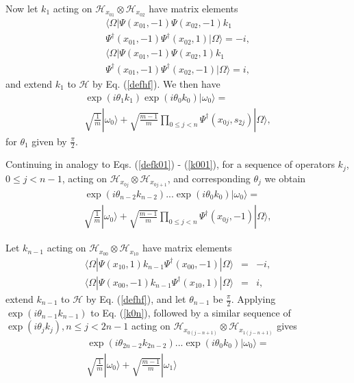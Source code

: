 \documentclass[twocolumn,amsmath,amssymb]{revtex4-1}
\begin{document}
Now let $k_{1}$ acting on $\mathcal{H}_{x_{01}} \otimes \mathcal{H}_{x_{02}}$
have matrix elements
\begin{multline}
\label{defk011}
 \langle  \Omega| \Psi( x_{01}, -1) \Psi( x_{02}, -1) k_1  \\
\Psi^{\dagger}(x_{01},-1) \Psi^{\dagger}( x_{02}, 1)|\Omega \rangle  = -i,
\end{multline}
\begin{multline}
\label{defk101}
 \langle  \Omega| \Psi(x_{01},-1) \Psi( x_{02}, 1) k_1
 \\ \Psi^{\dagger}(x_{01},-1) \Psi^{\dagger}( x_{02},-1)|\Omega \rangle  = i,
\end{multline}
and extend $k_1$ to $\mathcal{H}$ by Eq. (\ref{defhf}).
We then have
\begin{multline}
\label{k001}
\exp( i \theta_1 k_1) \exp( i \theta_0 k_0)|\omega_0 \rangle  = \\
\sqrt{\frac{1}{m}} |\omega_0 \rangle  +
\sqrt{\frac{m - 1}{m}} \prod_{0 \le j < n} \Psi^{\dagger}( x_{0j}, s_{2j}) |\Omega \rangle ,
\end{multline}
for $\theta_1$ given by $\frac{\pi}{2}$.


Continuing in analogy to Eqs. (\ref{defk01}) - (\ref{k001}),
for a sequence of operators $k_j$, $0 \le j < n-1$, acting on
$\mathcal{H}_{x_{0j}} \otimes \mathcal{H}_{x_{0j+1}}$, and corresponding
$\theta_j$ we obtain
\begin{multline}
\label{k0n}
\exp( i \theta_{n-2} k_{n-2}) ... \exp( i \theta_0 k_0) |\omega_0 \rangle  = \\
\sqrt{\frac{1}{m}} |\omega_0 \rangle  +
\sqrt{\frac{m - 1}{m}} \prod_{0 \le j < n} \Psi^{\dagger}( x_{0j}, -1) |\Omega \rangle ,
\end{multline}

Let $k_{n-1}$ acting on $\mathcal{H}_{x_{00}} \otimes \mathcal{H}_{x_{10}}$
have matrix elements
\begin{subequations}
\begin{eqnarray}
\label{defknm1}
 \langle  \Omega| \Psi( x_{10}, 1) k_{n-1}  \Psi^{\dagger}(x_{00},-1)|\Omega \rangle  &=& -i, \\
\label{defknm11}
 \langle  \Omega| \Psi(x_{00},-1)  k_{n-1} \Psi^{\dagger}( x_{10},1)|\Omega \rangle  &=& i,
\end{eqnarray}
\end{subequations}
extend $k_{n-1}$ to $\mathcal{H}$ by Eq. (\ref{defhf}),
and let $\theta_{n-1}$ be $\frac{\pi}{2}$.
Applying $\exp(i \theta_{n-1} k_{n-1})$ to Eq. (\ref{k0n}),
followed by a similar sequence of $\exp(i \theta_j k_j), n \le j < 2n -1$ acting on
$\mathcal{H}_{x_{0(j-n+1)}} \otimes \mathcal{H}_{x_{1(j-n+1)}}$ gives
\begin{multline}
\label{k02n}
\exp( i \theta_{2n-2} k_{2n-2}) ... \exp( i \theta_0 k_0) |\omega_0 \rangle  = \\
\sqrt{\frac{1}{m}} |\omega_0 \rangle  +
\sqrt{\frac{m - 1}{m}} |\omega_1 \rangle 
\end{multline}
\end{document}
